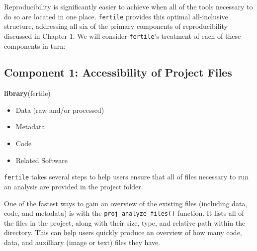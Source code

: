 \documentclass[12pt,twoside]{reedthesis}
\newenvironment{Shaded}{\begin{snugshade}}{\end{snugshade}}
\newcommand{\KeywordTok}[1]{\textcolor[rgb]{0.13,0.29,0.53}{\textbf{#1}}}
\newcommand{\NormalTok}[1]{#1}
\providecommand{\tightlist}{%
  \setlength{\itemsep}{0pt}\setlength{\parskip}{0pt}}
\begin{document}
Reproducibility is significantly easier to achieve when all of the tools
necessary to do so are located in one place. \texttt{fertile} provides
this optimal all-inclusive structure, addressing all six of the primary
components of reproducibility discussed in Chapter 1. We will consider
\texttt{fertile}'s treatment of each of these components in turn:

\subsection{Component 1: Accessibility of Project
Files}\label{component-1-accessibility-of-project-files}
\begin{Shaded}
\begin{Highlighting}[]
\KeywordTok{library}\NormalTok{(fertile)}
\end{Highlighting}
\end{Shaded}
\begin{itemize}
\tightlist
\item
  Data (raw and/or processed)
\item
  Metadata
\item
  Code
\item
  Related Software
\end{itemize}
\texttt{fertile} takes several steps to help users ensure that all of
files necessary to run an analysis are provided in the project folder.

One of the fastest ways to gain an overview of the existing files
(including data, code, and metadata) is with the
\texttt{proj\_analyze\_files()} function. It lists all of the files in
the project, along with their size, type, and relative path within the
directory. This can help users quickly produce an overview of how many
code, data, and auxilliary (image or text) files they have.
\end{document}
